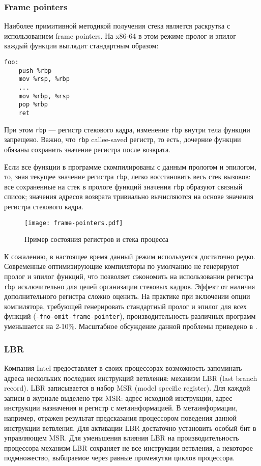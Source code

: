 \subsubsection{Frame pointers}
Наиболее примитивной методикой получения стека является раскрутка с использованием frame pointers.
На x86-64 в этом режиме пролог и эпилог каждый функции выглядит стандартным образом:
\begin{verbatim}
foo:
    push %rbp
    mov %rsp, %rbp
    ...
    mov %rbp, %rsp
    pop %rbp
    ret
\end{verbatim}
При этом \verb!rbp! --- регистр стекового кадра, изменение \verb!rbp! внутри тела функции запрещено.
Важно, что \verb!rbp! callee-saved регистр, то есть, дочерние функции обязаны сохранить значение регистра после возврата.

Если все функции в программе скомпилированы с данным прологом и эпилогом,
то, зная текущее значение регистра \verb!rbp!, легко восстановить весь стек вызовов: все сохраненные на стек в прологе функций
значения \verb!rbp! образуют связный список; значения адресов возврата тривиально вычисляются на основе значения регистра стекового кадра.

\begin{figure}[H]
    \centering
    \texttt{[image: frame-pointers.pdf]}
    \caption{Пример состояния регистров и стека процесса}
    \label{fig:fp}
\end{figure}

К сожалению, в настоящее время данный режим используется достаточно редко.
Современные оптимизирующие компиляторы по умолчанию не генерируют пролог и эпилог функций,
что позволяет сэкономить на использовании регистра \verb!rbp! исключительно для целей организации стековых кадров.
Эффект от наличия дополнительного регистра сложно оценить.
На практике при включении опции компилятора, требующей генерировать стандартный пролог и эпилог для всех функций
(\verb!-fno-omit-frame-pointer!), производительность различных программ уменьшается на 2-10\%.
Масштабное обсуждение данной проблемы приведено в \cite{fp:fedora}.

\subsubsection{LBR} \label{sec:lbr}
Компания Intel предоставляет в своих процессорах возможность запоминать адреса нескольких последних инструкций ветвления:
механизм LBR (last branch record). LBR записывается в набор MSR (model specific register).
Для каждой записи в журнале выделено три MSR: адрес исходной инструкции, адрес инструкции назначения и регистр с метаинформацией.
В метаинформации, например, отражен результат предсказания процессором поведения данной инструкции ветвления.
Для активации LBR достаточно установить особый бит в управляющем MSR.
Для уменьшения влияния LBR на производительность процессора механизм LBR сохраняет не все инструкции ветвления, а некоторое подмножество,
выбираемое через равные промежутки циклов процессора.

